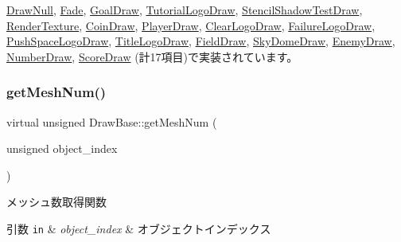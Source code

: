 \mbox{\hyperlink{class_draw_null_a72ac0b7dc40b1469582419dcc5b0e114}{Draw\+Null}}, \mbox{\hyperlink{class_fade_a84a9e688650ac500e03cde74ff0210b8}{Fade}}, \mbox{\hyperlink{class_goal_draw_a554c826d7a4534ee489dfe18edf7ee0e}{Goal\+Draw}}, \mbox{\hyperlink{class_tutorial_logo_draw_aa808cfb8bc59d58bbd698a195603429f}{Tutorial\+Logo\+Draw}}, \mbox{\hyperlink{class_stencil_shadow_test_draw_abb5f9445b7d94c213a3751fa57e36643}{Stencil\+Shadow\+Test\+Draw}}, \mbox{\hyperlink{class_render_texture_a529ab829c676470ae5764b42cba9efb0}{Render\+Texture}}, \mbox{\hyperlink{class_coin_draw_ac7d91fecb6845cebe276eb81a4953563}{Coin\+Draw}}, \mbox{\hyperlink{class_player_draw_a8b9e8caa6bea7295f58a0aaddeb9458b}{Player\+Draw}}, \mbox{\hyperlink{class_clear_logo_draw_ab018f370071f370ae7016d8ee402c456}{Clear\+Logo\+Draw}}, \mbox{\hyperlink{class_failure_logo_draw_a8ee20e1697bbbaf7f41c18334830488a}{Failure\+Logo\+Draw}}, \mbox{\hyperlink{class_push_space_logo_draw_a647dddefc43d66cb3c720ee8fbb6a783}{Push\+Space\+Logo\+Draw}}, \mbox{\hyperlink{class_title_logo_draw_a01e4cb21d580bac86a226fa2e35bf4a3}{Title\+Logo\+Draw}}, \mbox{\hyperlink{class_field_draw_a1915497654d079074dbd3e058db06a78}{Field\+Draw}}, \mbox{\hyperlink{class_sky_dome_draw_a42364ea42618cbab588d55050edfe95a}{Sky\+Dome\+Draw}}, \mbox{\hyperlink{class_enemy_draw_a20a23c1c5fd5e510d15e8ca27aabd821}{Enemy\+Draw}}, \mbox{\hyperlink{class_number_draw_a15e4e602b3f9372349d0b6ff9e4fc423}{Number\+Draw}}, \mbox{\hyperlink{class_score_draw_a799e71943140a264cedba6002308b976}{Score\+Draw}} (計17項目)で実装されています。

\mbox{\label{class_draw_base_add488139aed539e7ccd19492702b4bee}} 
\subsubsection{\texorpdfstring{get\+Mesh\+Num()}{getMeshNum()}}
{\footnotesize\ttfamily virtual unsigned Draw\+Base\+::get\+Mesh\+Num (\begin{DoxyParamCaption}\item[{unsigned}]{object\+\_\+index }\end{DoxyParamCaption})\hspace{0.3cm}{\ttfamily [pure virtual]}}



メッシュ数取得関数 


\begin{DoxyParams}[1]{引数}
\mbox{\tt in}  & {\em object\+\_\+index} & オブジェクトインデックス \\
\hline
\end{DoxyParams}

